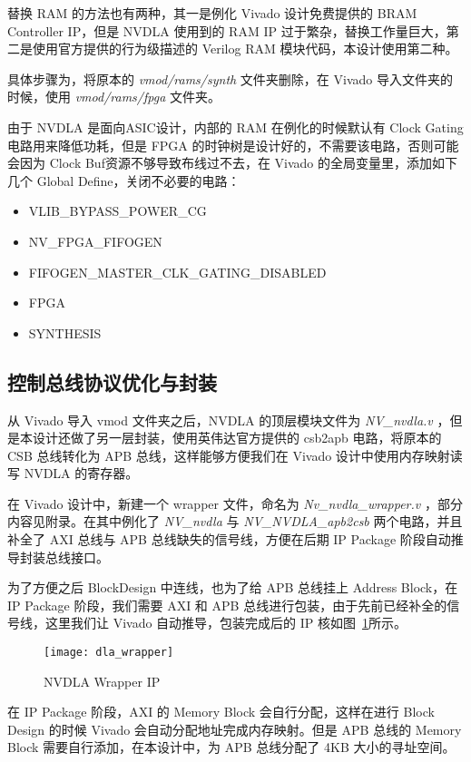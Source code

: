 替换 RAM 的方法也有两种，其一是例化 Vivado 设计免费提供的 BRAM Controller IP，但是 NVDLA 使用到的 RAM IP 过于繁杂，替换工作量巨大，第二是使用官方提供的行为级描述的 Verilog RAM 模块代码，本设计使用第二种。

具体步骤为，将原本的 \emph{vmod/rams/synth} 文件夹删除，在 Vivado 导入文件夹的时候，使用 \emph{vmod/rams/fpga} 文件夹。

由于 NVDLA 是面向ASIC设计，内部的 RAM 在例化的时候默认有 Clock Gating 电路用来降低功耗，但是 FPGA 的时钟树是设计好的，不需要该电路，否则可能会因为 Clock Buf资源不够导致布线过不去，在 Vivado 的全局变量里，添加如下几个 Global Define，关闭不必要的电路：

\begin{itemize}
    \item VLIB\_BYPASS\_POWER\_CG
    \item NV\_FPGA\_FIFOGEN
    \item FIFOGEN\_MASTER\_CLK\_GATING\_DISABLED
    \item FPGA
    \item SYNTHESIS
\end{itemize}

\subsection{控制总线协议优化与封装}

从 Vivado 导入 vmod 文件夹之后，NVDLA 的顶层模块文件为 \emph{NV\_nvdla.v} ，但是本设计还做了另一层封装，使用英伟达官方提供的 csb2apb 电路，将原本的 CSB 总线转化为 APB 总线，这样能够方便我们在 Vivado 设计中使用内存映射读写 NVDLA 的寄存器。

在 Vivado 设计中，新建一个 wrapper 文件，命名为 \emph{Nv\_nvdla\_wrapper.v} ，部分内容见附录。在其中例化了 \emph{NV\_nvdla} 与 \emph{NV\_NVDLA\_apb2csb} 两个电路，并且补全了 AXI 总线与 APB 总线缺失的信号线，方便在后期 IP Package 阶段自动推导封装总线接口。

为了方便之后 BlockDesign 中连线，也为了给 APB 总线挂上 Address Block，在 IP Package 阶段，我们需要 AXI 和 APB 总线进行包装，由于先前已经补全的信号线，这里我们让 Vivado 自动推导，包装完成后的 IP 核如图~\ref{fig:NVDLA Wrapper}所示。

\begin{figure}[!htbp]
    \centering
    \texttt{[image: dla\_wrapper]}
    \caption{NVDLA Wrapper IP}
    \label{fig:NVDLA Wrapper}
\end{figure}

在 IP Package 阶段，AXI 的 Memory Block 会自行分配，这样在进行 Block Design 的时候 Vivado 会自动分配地址完成内存映射。但是 APB 总线的 Memory Block 需要自行添加，在本设计中，为 APB 总线分配了 4KB 大小的寻址空间。

